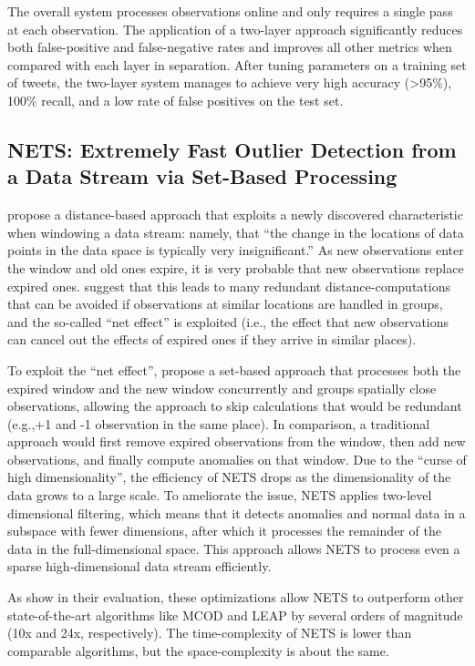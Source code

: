 The overall system processes observations online and only requires a single pass at each observation. The application of a two-layer approach significantly reduces both false-positive and false-negative rates and improves all other metrics when compared with each layer in separation. After tuning parameters on a training set of tweets, the two-layer system manages to achieve very high accuracy (>95\%), 100\% recall, and a low rate of false positives on the test set.


\subsection{NETS: Extremely Fast Outlier Detection from a Data Stream via Set-Based Processing \citep{yoon_nets:_2019}}
\citet{yoon_nets:_2019} propose a distance-based approach that exploits a newly discovered characteristic when windowing a data stream: namely, that ``the change in the locations of data points in the data space is typically very insignificant.'' As new observations enter the window and old ones expire, it is very probable that new observations replace expired ones. \citet{yoon_nets:_2019} suggest that this leads to many redundant distance-computations that can be avoided if observations at similar locations are handled in groups, and the so-called ``net effect'' is exploited (i.e., the effect that new observations can cancel out the effects of expired ones if they arrive in similar places).

To exploit the ``net effect'', \citet{yoon_nets:_2019} propose a set-based approach that processes both the expired window and the new window concurrently and groups spatially close observations, allowing the approach to skip calculations that would be redundant (e.g.,+1 and -1 observation in the same place). In comparison, a traditional approach would first remove expired observations from the window, then add new observations, and finally compute anomalies on that window. Due to the ``curse of high dimensionality'', the efficiency of NETS drops as the dimensionality of the data grows to a large scale. To ameliorate the issue, NETS applies two-level dimensional filtering, which means that it detects anomalies and normal data in a subspace with fewer dimensions, after which it processes the remainder of the data in the full-dimensional space. This approach allows NETS to process even a sparse high-dimensional data stream efficiently.

As \citet{yoon_nets:_2019} show in their evaluation, these optimizations allow NETS to outperform other state-of-the-art algorithms like MCOD and LEAP by several orders of magnitude (10x and 24x, respectively). The time-complexity of NETS is lower than comparable algorithms, but the space-complexity is about the same.


